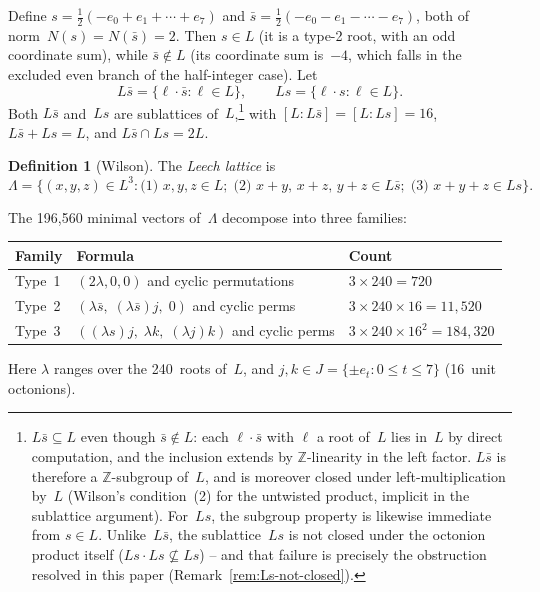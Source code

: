 \documentclass[twoside,english]{paper}
\numberwithin{equation}{section}
\numberwithin{figure}{section}
\theoremstyle{definition}
\newtheorem{definition}[theorem]{Definition}
\theoremstyle{remark}
\newcommand{\ZZ}{\mathbb{Z}}
\newcommand{\LL}{\Lambda}             %
\newcommand{\Nrm}{N}                  %
\begin{document}
Define $s = \tfrac{1}{2}(-e_0 + e_1 + \cdots + e_7)$ and
$\bar{s} = \tfrac{1}{2}(-e_0 - e_1 - \cdots - e_7)$, both of
norm~$\Nrm(s) = \Nrm(\bar{s}) = 2$.  Then $s \in L$ (it is a
type-2 root, with an odd coordinate sum), while $\bar{s} \notin L$
(its coordinate sum is~$-4$, which falls in the excluded even
branch of the half-integer case).  Let
\[
  L\bar{s} = \{ \ell \cdot \bar{s} : \ell \in L \}, \qquad
  Ls = \{ \ell \cdot s : \ell \in L \}.
\]
Both $L\bar{s}$ and~$Ls$ are sublattices of~$L$,\footnote{$L\bar
s \subseteq L$ even though $\bar s \notin L$: each $\ell \cdot
\bar s$ with $\ell$ a root of~$L$ lies in~$L$ by direct
computation, and the inclusion extends by $\ZZ$-linearity in the
left factor. $L\bar s$ is therefore a $\ZZ$-subgroup of~$L$, and
is moreover closed under left-multiplication by~$L$ (Wilson's
condition~(2) for the untwisted product, implicit in the sublattice
argument). For~$Ls$, the subgroup
property is likewise immediate from $s \in L$.  Unlike~$L\bar s$,
the sublattice~$Ls$ is not closed under the octonion product
itself ($Ls \cdot Ls \not\subseteq Ls$) -- and that failure is
precisely the obstruction resolved in this paper
(Remark~\ref{rem:Ls-not-closed}).}
with
$[L : L\bar{s}] = [L : Ls] = 16$,
$L\bar{s} + Ls = L$, and $L\bar{s} \cap Ls = 2L$.

\begin{definition}[Wilson]\label{def:wilson-leech}
The \emph{Leech lattice} is
\[
  \LL = \bigl\{ (x,y,z) \in L^3 :
    \text{(1) } x,y,z \in L;\;
    \text{(2) } x{+}y,\, x{+}z,\, y{+}z \in L\bar{s};\;
    \text{(3) } x{+}y{+}z \in Ls
  \bigr\}.
\]
\end{definition}

The 196{,}560 minimal vectors of~$\LL$ decompose into three families:

\smallskip
\begin{tabular}{@{}lll@{}}
\toprule
Family & Formula & Count \\
\midrule
Type~1 & $(2\lambda, 0, 0)$ and cyclic permutations & $3 \times 240 = 720$ \\
Type~2 & $(\lambda\bar{s},\; (\lambda\bar{s})j,\; 0)$ and cyclic
  perms & $3 \times 240 \times 16 = 11{,}520$ \\
Type~3 & $((\lambda s)j,\; \lambda k,\; (\lambda j)k)$ and cyclic
  perms & $3 \times 240 \times 16^2 = 184{,}320$ \\
\bottomrule
\end{tabular}
\smallskip

\noindent
Here $\lambda$ ranges over the 240~roots of~$L$, and
$j, k \in J = \{\pm e_t : 0 \le t \le 7\}$ (16~unit octonions).
\end{document}
